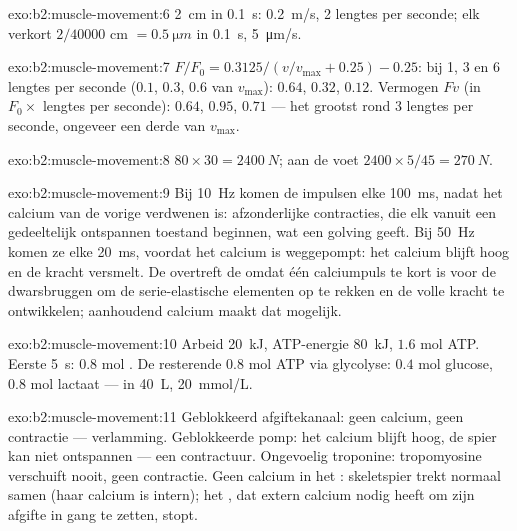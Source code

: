 \begin{solution}{exo:b2:muscle-movement:6}
\qty{2}{cm} in \qty{0.1}{s}: \qty{0.2}{m/s}, 2 lengtes per seconde; elk
 verkort $2/\num{40000}$ cm $= \qty{0.5}{\micro m}$ in
\qty{0.1}{s}, \qty{5}{\micro m/s}.
\end{solution}

\begin{solution}{exo:b2:muscle-movement:7}
$F/F_0 = 0.3125/(v/v_{\max} + 0.25) - 0.25$: bij 1, 3 en 6 lengtes per
seconde ($0.1$, $0.3$, $0.6$ van $v_{\max}$): $0.64$, $0.32$, $0.12$.
Vermogen $Fv$ (in $F_0\times$ lengtes per seconde): $0.64$, $0.95$, $0.71$
--- het grootst rond 3 lengtes per seconde, ongeveer een derde van $v_{\max}$.
\end{solution}

\begin{solution}{exo:b2:muscle-movement:8}
$80\times 30 = \qty{2400}{N}$; aan de voet $2400\times 5/45 =
\qty{270}{N}$.
\end{solution}

\begin{solution}{exo:b2:muscle-movement:9}
Bij \qty{10}{Hz} komen de impulsen elke \qty{100}{ms}, nadat het calcium van
de vorige verdwenen is: afzonderlijke contracties, die elk vanuit een
gedeeltelijk ontspannen toestand beginnen, wat een golving geeft. Bij
\qty{50}{Hz} komen ze elke \qty{20}{ms}, voordat het calcium is weggepompt:
het calcium blijft hoog en de kracht versmelt. De  overtreft de
 omdat één calciumpuls te kort is voor de dwarsbruggen
om de serie-elastische elementen op te rekken en de volle kracht te
ontwikkelen; aanhoudend calcium maakt dat mogelijk.
\end{solution}

\begin{solution}{exo:b2:muscle-movement:10}
Arbeid \qty{20}{kJ}, ATP-energie \qty{80}{kJ}, $1.6$ mol ATP. Eerste
\qty{5}{s}: $0.8$ mol . De resterende $0.8$ mol ATP
via glycolyse: $0.4$ mol glucose, $0.8$ mol lactaat --- in
\qty{40}{L}, \qty{20}{mmol/L}.
\end{solution}

\begin{solution}{exo:b2:muscle-movement:11}
Geblokkeerd afgiftekanaal: geen calcium, geen contractie --- verlamming.
Geblokkeerde pomp: het calcium blijft hoog, de spier kan niet ontspannen ---
een contractuur. Ongevoelig troponine: tropomyosine verschuift nooit, geen
contractie. Geen calcium in het : skeletspier trekt normaal samen (haar
calcium is intern); het , dat extern calcium nodig heeft om zijn afgifte
in gang te zetten, stopt.
\end{solution}

